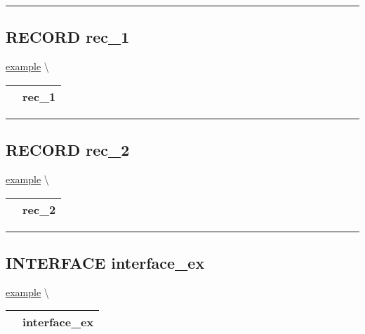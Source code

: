 \rule{\linewidth}{0.5pt}

\subsection*{\textsf{\colorbox{headtoc}{\color{white} RECORD}
rec\_1}}

\hypertarget{ecldoc:example.rec_1}{}
\hspace{0pt} \hyperlink{ecldoc:example}{example} \textbackslash 

{\renewcommand{\arraystretch}{1.5}
\begin{tabularx}{\textwidth}{|>{\raggedright\arraybackslash}l|X|}
\hline
\hspace{0pt}\mytexttt{\color{red} } & \textbf{rec\_1} \\
\hline
\end{tabularx}
}

\par


\rule{\linewidth}{0.5pt}
\subsection*{\textsf{\colorbox{headtoc}{\color{white} RECORD}
rec\_2}}

\hypertarget{ecldoc:example.rec_2}{}
\hspace{0pt} \hyperlink{ecldoc:example}{example} \textbackslash 

{\renewcommand{\arraystretch}{1.5}
\begin{tabularx}{\textwidth}{|>{\raggedright\arraybackslash}l|X|}
\hline
\hspace{0pt}\mytexttt{\color{red} } & \textbf{rec\_2} \\
\hline
\end{tabularx}
}

\par


\rule{\linewidth}{0.5pt}
\subsection*{\textsf{\colorbox{headtoc}{\color{white} INTERFACE}
interface\_ex}}

\hypertarget{ecldoc:example.interface_ex}{}
\hspace{0pt} \hyperlink{ecldoc:example}{example} \textbackslash 

{\renewcommand{\arraystretch}{1.5}
\begin{tabularx}{\textwidth}{|>{\raggedright\arraybackslash}l|X|}
\hline
\hspace{0pt}\mytexttt{\color{red} } & \textbf{interface\_ex} \\
\hline
\end{tabularx}
}

